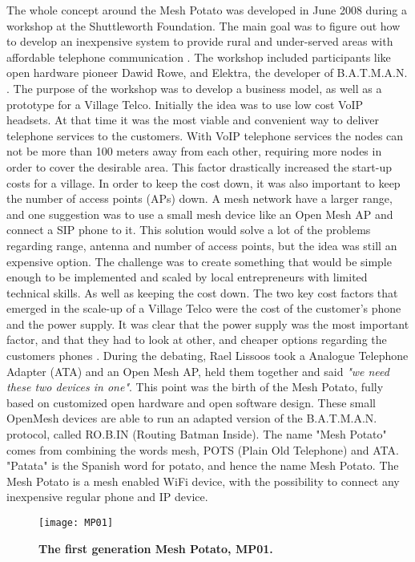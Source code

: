 The whole concept around the Mesh Potato was developed in June 2008 during a workshop at the Shuttleworth Foundation. The main goal was to figure out how to develop an inexpensive system to provide rural and under-served areas with affordable telephone communication \cite{MParticle}. The workshop included participants like open hardware pioneer Dawid Rowe, and Elektra, the developer of B.A.T.M.A.N. \cite{MPworkshop}. The purpose of the workshop was to develop a business model, as well as a prototype for a Village Telco. Initially the idea was to use low cost VoIP headsets. At that time it was the most viable and convenient way to deliver telephone services to the customers. With VoIP telephone services the nodes can not be more than 100 meters away from each other, requiring more nodes in order to cover the desirable area. This factor drastically increased the start-up costs for a village. In order to keep the cost down, it was also important to keep the number of access points (APs) down. A mesh network have a larger range, and one suggestion was to use a small mesh device like an Open Mesh AP and connect a SIP phone to it. This solution would solve a lot of the problems regarding range, antenna and number of access points, but the idea was still an expensive option. The challenge was to create something that would be simple enough to be implemented and scaled by local entrepreneurs with limited technical skills. As well as keeping the cost down. The two key cost factors that emerged in the scale-up of a Village Telco were the cost of the customer's phone and the power supply. It was clear that the power supply was the most important factor, and that they had to look at other, and cheaper options regarding the customers phones \cite{MPworkshop}. During the debating, Rael Lissoos took a Analogue Telephone Adapter (ATA) and an Open Mesh AP, held them together and said \textit{"we need these two devices in one"}. This point was the birth of the Mesh Potato, fully based on customized open hardware and open software design. These small OpenMesh devices are able to run an adapted version of the B.A.T.M.A.N. protocol, called RO.B.IN (Routing Batman Inside). The name "Mesh Potato" comes from combining the words mesh, POTS (Plain Old Telephone) and ATA. "Patata" is the Spanish word for potato, and hence the name Mesh Potato. The Mesh Potato is a mesh enabled WiFi device, with the possibility to connect any inexpensive regular phone and IP device. \cite{MPorigin}

\begin{figure}[b]
  \centering
      \texttt{[image: MP01]}
  \caption [MP01]{\textbf{The first generation Mesh Potato, MP01.}}
  \label{fig:MP01}
\end{figure}

